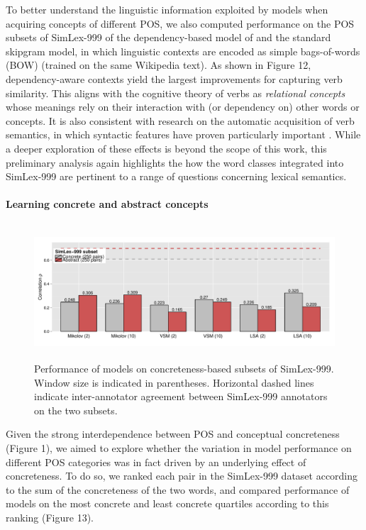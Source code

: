 \documentclass[fullname]{clv2}
\begin{document}
To better understand the linguistic information exploited by models when acquiring concepts of different POS, we also computed performance on the POS subsets of SimLex-999 of the dependency-based model of  and the standard skipgram model, in which linguistic contexts are encoded as simple bags-of-words (BOW)  (trained on the same Wikipedia text). As shown in Figure 12, dependency-aware contexts yield the largest improvements for capturing verb similarity. This aligns with the cognitive theory of verbs as \emph{relational concepts} \cite{markman1997similar} whose meanings rely on their interaction with (or dependency on) other words or concepts. It is also consistent with research on the automatic acquisition of verb semantics, in which syntactic features have proven particularly important \cite{sun2008verb}.  While a deeper exploration of these effects is beyond the scope of this work, this preliminary analysis again highlights the how the word classes integrated into SimLex-999 are pertinent to a range of questions concerning lexical semantics. 



\paragraph{\bf Learning concrete and abstract concepts}

\begin{figure}[ht]  \includegraphics[width = \textwidth,height=5cm]{Figure_4_CL}  \caption{Performance of models on concreteness-based subsets of SimLex-999. Window size is indicated in parentheses. Horizontal dashed lines indicate inter-annotator agreement between SimLex-999 annotators on the two subsets.}\end{figure}


Given the strong interdependence between POS and conceptual concreteness (Figure 1), we aimed to explore whether the variation in model performance on different POS categories was in fact driven by an underlying effect of concreteness. To do so, we	 ranked each pair in the SimLex-999 dataset according to the sum of the concreteness of the two words, and compared performance of models on the most concrete and least concrete quartiles according to this ranking (Figure 13). 
\end{document}
